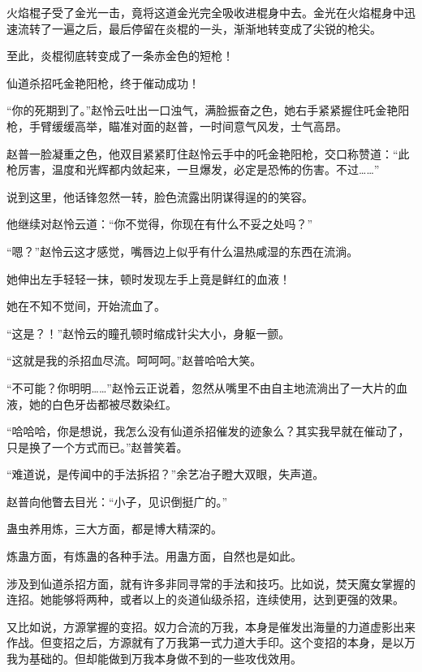 
\begin{this_body}

火焰棍子受了金光一击，竟将这道金光完全吸收进棍身中去。金光在火焰棍身中迅速流转了一遍之后，最后停留在炎棍的一头，渐渐地转变成了尖锐的枪尖。

至此，炎棍彻底转变成了一条赤金色的短枪！

仙道杀招吒金艳阳枪，终于催动成功！

“你的死期到了。”赵怜云吐出一口浊气，满脸振奋之色，她右手紧紧握住吒金艳阳枪，手臂缓缓高举，瞄准对面的赵普，一时间意气风发，士气高昂。

赵普一脸凝重之色，他双目紧紧盯住赵怜云手中的吒金艳阳枪，交口称赞道：“此枪厉害，温度和光辉都内敛起来，一旦爆发，必定是恐怖的伤害。不过……”

说到这里，他话锋忽然一转，脸色流露出阴谋得逞的的笑容。

他继续对赵怜云道：“你不觉得，你现在有什么不妥之处吗？”

“嗯？”赵怜云这才感觉，嘴唇边上似乎有什么温热咸湿的东西在流淌。

她伸出左手轻轻一抹，顿时发现左手上竟是鲜红的血液！

她在不知不觉间，开始流血了。

“这是？！”赵怜云的瞳孔顿时缩成针尖大小，身躯一颤。

“这就是我的杀招血尽流。呵呵呵。”赵普哈哈大笑。

“不可能？你明明……”赵怜云正说着，忽然从嘴里不由自主地流淌出了一大片的血液，她的白色牙齿都被尽数染红。

“哈哈哈，你是想说，我怎么没有仙道杀招催发的迹象么？其实我早就在催动了，只是换了一个方式而已。”赵普笑着。

“难道说，是传闻中的手法拆招？”余艺冶子瞪大双眼，失声道。

赵普向他瞥去目光：“小子，见识倒挺广的。”

蛊虫养用炼，三大方面，都是博大精深的。

炼蛊方面，有炼蛊的各种手法。用蛊方面，自然也是如此。

涉及到仙道杀招方面，就有许多非同寻常的手法和技巧。比如说，焚天魔女掌握的连招。她能够将两种，或者以上的炎道仙级杀招，连续使用，达到更强的效果。

又比如说，方源掌握的变招。奴力合流的万我，本身是催发出海量的力道虚影出来作战。但变招之后，方源就有了万我第一式力道大手印。这个变招的本身，是以万我为基础的。但却能做到万我本身做不到的一些攻伐效用。


\end{this_body}
